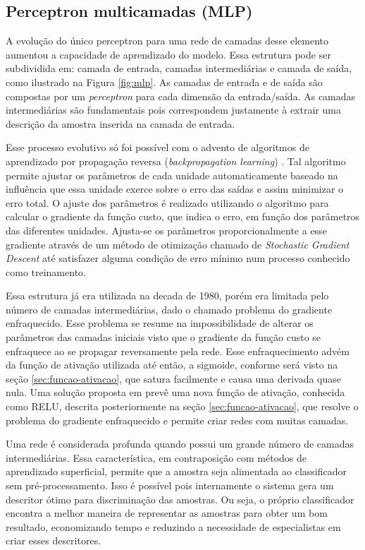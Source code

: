 \subsection{Perceptron multicamadas (MLP)}
A evolução do único perceptron para uma rede de camadas desse elemento aumentou a capacidade de aprendizado do modelo. Essa estrutura pode ser subdividida em: camada de entrada, camadas intermediárias e camada de saída, como ilustrado na Figura \ref{fig:mlp}. As camadas de entrada e de saída são compostas por um \textit{perceptron} para cada dimensão da entrada/saída. As camadas intermediárias são fundamentais pois correspondem justamente à extrair uma descrição da amostra inserida na camada de entrada.

Esse processo evolutivo só foi possível com o advento de algoritmos de aprendizado por propagação reversa (\textit{backpropagation learning}) \cite{backpropagation}. Tal algoritmo permite ajustar os parâmetros de cada unidade automaticamente baseado na influência que essa unidade exerce sobre o erro das saídas e assim minimizar o erro total. O ajuste dos parâmetros é realizado utilizando o algoritmo para calcular o gradiente da função custo, que indica o erro, em função dos parâmetros das diferentes unidades. Ajusta-se os parâmetros proporcionalmente a esse gradiente através de um método de otimização chamado de \textit{Stochastic Gradient Descent} \cite{DLbook} até satisfazer alguma condição de erro mínimo num processo conhecido como treinamento.

Essa estrutura já era utilizada na decada de 1980, porém era limitada pelo número de camadas intermediárias, dado o chamado problema do gradiente enfraquecido. Esse problema se resume na impossibilidade de alterar os parâmetros das camadas iniciais visto que o gradiente da função custo se enfraquece ao se propagar reversamente pela rede. Esse enfraquecimento advém da função de ativação utilizada até então, a sigmoide, conforme será visto na seção \ref{sec:funcao-ativacao}, que satura facilmente e causa uma derivada quase nula. Uma solução proposta em \cite{nair2010relu} prevê uma nova função de ativação, conhecida como RELU, descrita posteriormente na seção \ref{sec:funcao-ativacao}, que resolve o problema do gradiente enfraquecido e permite criar redes com muitas camadas.

Uma rede é considerada profunda quando possui um grande número de camadas intermediárias. Essa característica, em contraposição com métodos de aprendizado superficial, permite que a amostra seja alimentada ao classificador sem pré-processamento. Isso é possível pois internamente o sistema gera um descritor ótimo para discriminação das amostras. Ou seja, o próprio classificador encontra a melhor maneira de representar as amostras para obter um bom resultado, economizando tempo e reduzindo a necessidade de especialistas em criar esses descritores.

